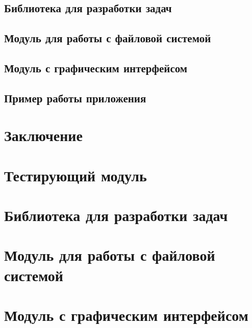 \section{Библиотека для разработки задач}

\section{Модуль для работы с файловой системой}

\section{Модуль с графическим интерфейсом}

\section{Пример работы приложения}


\chapter*{Заключение}




\newpage
\appendix
{}
\footnotesize
\chapter{Тестирующий модуль}

\chapter{Библиотека для разработки задач}

\chapter{Модуль для работы с файловой системой}

\chapter{Модуль с графическим интерфейсом}


